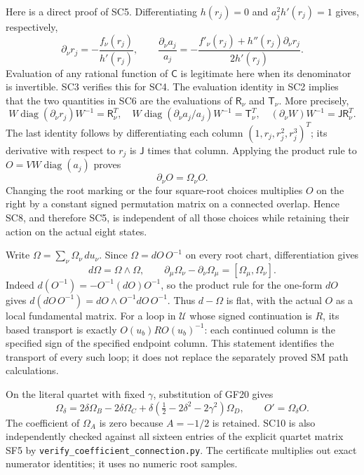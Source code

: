 Here is a direct proof of SC5. Differentiating $h(r_j)=0$ and
$a_j^2h'(r_j)=1$ gives, respectively,
\[
 \partial_\nu r_j=-\frac{f_\nu(r_j)}{h'(r_j)},\qquad
 \frac{\partial_\nu a_j}{a_j}
 =-\frac{f'_\nu(r_j)+h''(r_j)\partial_\nu r_j}{2h'(r_j)}.
 \tag{SC6}
\]
Evaluation of any rational function of $\mathsf C$ is legitimate here
when its denominator is invertible. SC3 verifies this for SC4.
The evaluation identity in SC2 implies that the two quantities in SC6
are the evaluations of $\mathsf R_\nu$ and $\mathsf T_\nu$.
More precisely,
\[
 W\operatorname{diag}(\partial_\nu r_j)W^{-1}
       =\mathsf R_\nu^T,\quad
 W\operatorname{diag}(\partial_\nu a_j/a_j)W^{-1}
       =\mathsf T_\nu^T,\quad
 (\partial_\nu W)W^{-1}=\mathsf J\mathsf R_\nu^T.
 \tag{SC7}
\]
The last identity follows by differentiating each column
$(1,r_j,r_j^2,r_j^3)^T$; its derivative with respect to $r_j$ is
$\mathsf J$ times that column. Applying the product rule to
$O=VW\operatorname{diag}(a_j)$ proves
\[
 \partial_\nu O=\Omega_\nu O. \tag{SC8}
\]
Changing the root marking or the four square-root choices multiplies
$O$ on the right by a constant signed permutation matrix on a connected
overlap. Hence SC8, and therefore SC5, is independent of all those
choices while retaining their action on the actual eight states.

Write $\Omega=\sum_\nu\Omega_\nu\,du_\nu$.
Since $\Omega=dO\,O^{-1}$ on every root chart, differentiation gives
\[
 d\Omega=\Omega\wedge\Omega,\qquad
 \partial_\mu\Omega_\nu-\partial_\nu\Omega_\mu
          =[\Omega_\mu,\Omega_\nu]. \tag{SC9}
\]
Indeed $d(O^{-1})=-O^{-1}(dO)O^{-1}$, so the product rule for the
one-form $dO$ gives $d(dO\,O^{-1})=dO\wedge O^{-1}dO\,O^{-1}$.
Thus $d-\Omega$ is flat, with the actual $O$ as a local fundamental
matrix. For a loop in $\mathcal U$ whose signed continuation is $R$,
its based transport is exactly $O(u_b)R O(u_b)^{-1}$: each continued
column is the specified sign of the specified endpoint column. This
statement identifies the transport of every such loop; it does not
replace the separately proved SM path calculations.

On the literal quartet with fixed $\gamma$, substitution of GF20 gives
\[
 \Omega_\delta=2\delta\Omega_B-2\delta\Omega_C+
  \delta(\tfrac12-2\delta^2-2\gamma^2)\Omega_D,
 \qquad O'=\Omega_\delta O. \tag{SC10}
\]
The coefficient of $\Omega_A$ is zero because $A=-1/2$ is retained.
SC10 is also independently checked against all sixteen entries of the
explicit quartet matrix SF5 by
\texttt{verify\_coefficient\_connection.py}. The certificate multiplies
out exact numerator identities; it uses no numeric root samples.

